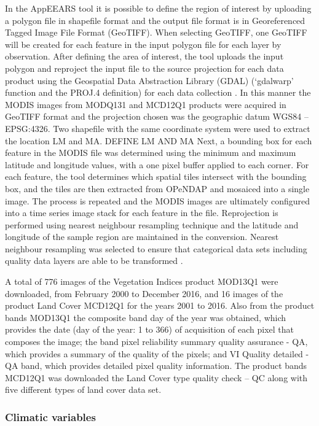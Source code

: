 In the AppEEARS tool it is possible to define the region of interest by uploading a polygon file in shapefile format and the output file format is in Georeferenced Tagged Image File Format (GeoTIFF). When selecting GeoTIFF, one GeoTIFF will be created for each feature in the input polygon file for each layer by observation. After defining the area of interest, the tool uploads the input polygon and reproject the input file to the source projection for each data product using the Geospatial Data Abstraction Library (GDAL) (‘gdalwarp’ function and the PROJ.4 definition) for each data collection \citep{usgs_2018}. In this manner the MODIS images from MODQ131 and MCD12Q1 products were acquired in GeoTIFF format and the projection chosen was the geographic datum WGS84 – EPSG:4326. Two shapefile with the same coordinate system were used to extract the location LM and MA. DEFINE LM AND MA Next, a bounding box for each feature in the MODIS file was determined using the minimum and maximum latitude and longitude values, with a one pixel buffer applied to each corner. For each feature, the tool determines which spatial tiles intersect with the bounding box, and the tiles are then extracted from OPeNDAP \citep{ cornillon_2003} and mosaiced into a single image. The process is repeated and the MODIS images are ultimately configured into a time series image stack for each feature in the file. Reprojection is performed using nearest neighbour resampling technique and the latitude and longitude of the sample region are maintained in the conversion. Nearest neighbour resampling was selected to ensure that categorical data sets including quality data layers are able to be transformed \citep{usgs_2018}. 

A total of 776 images of the Vegetation Indices product MOD13Q1 were downloaded, from February 2000 to December 2016, and 16 images of the product Land Cover MCD12Q1 for the years 2001 to 2016. Also from the product bands MOD13Q1 the composite band day of the year was obtained, which provides the date (day of the year: 1 to 366) of acquisition of each pixel that composes the image; the band pixel reliability summary quality assurance - QA, which provides a summary of the quality of the pixels; and VI Quality detailed - QA band, which provides detailed pixel quality information. The product bands MCD12Q1 was downloaded the Land Cover type quality check – QC along with five different types of land cover data set.

\subsubsection{Climatic variables} %


